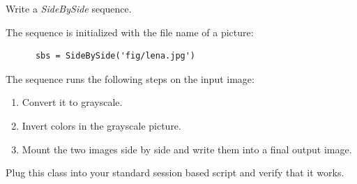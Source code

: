 \documentclass[english,serif,mathserif,xcolor=pdftex,dvipsnames,table]{beamer}
\begin{document}
\begin{frame}[fragile]
  \begin{exercise}
    Write a \emph{SideBySide} sequence. 

    \+ 
    The sequence is initialized with the file name of a picture:
    \begin{lstlisting}
      sbs = SideBySide('fig/lena.jpg')
    \end{lstlisting}

    \+
    The sequence runs the following steps on the input image:
    \begin{enumerate}
    \item Convert it to grayscale.
    \item Invert colors in the grayscale picture.
    \item Mount the two images side by side and write them into a final output image.
    \end{enumerate}

    \+ 
    Plug this class into your standard session based script and
    verify that it works.
  \end{exercise}
\end{frame}
\end{document}
